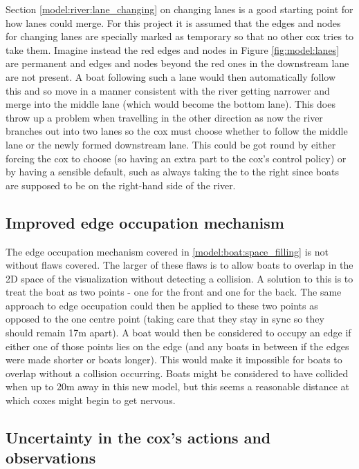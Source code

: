 Section \ref{model:river:lane_changing} on changing lanes is a good starting point for how lanes could merge. For this project it is assumed that the edges and nodes for changing lanes are specially marked as temporary so that no other cox tries to take them. Imagine instead the red edges and nodes in Figure \ref{fig:model:lanes} are permanent and edges and nodes beyond the red ones in the downstream lane are not present. A boat following such a lane would then automatically follow this and so move in a manner consistent with the river getting narrower and merge into the middle lane (which would become the bottom lane). This does throw up a problem when travelling in the other direction as now the river branches out into two lanes so the cox must choose whether to follow the middle lane or the newly formed downstream lane. This could be got round by either forcing the cox to choose (so having an extra part to the cox's control policy) or by having a sensible default, such as always taking the to the right since boats are supposed to be on the right-hand side of the river.

\subsection{Improved edge occupation mechanism}

The edge occupation mechanism covered in \ref{model:boat:space_filling} is not without flaws covered. The larger of these flaws is to allow boats to overlap in the 2D space of the visualization without detecting a collision. A solution to this is to treat the boat as two points - one for the front and one for the back. The same approach to edge occupation could then be applied to these two points as opposed to the one centre point (taking care that they stay in sync so they should remain 17m apart). A boat would then be considered to occupy an edge if either one of those points lies on the edge (and any boats in between if the edges were made shorter or boats longer). This would make it impossible for boats to overlap without a collision occurring. Boats might be considered to have collided when up to 20m away in this new model, but this seems a reasonable distance at which coxes might begin to get nervous.

\subsection{Uncertainty in the cox's actions and observations}

